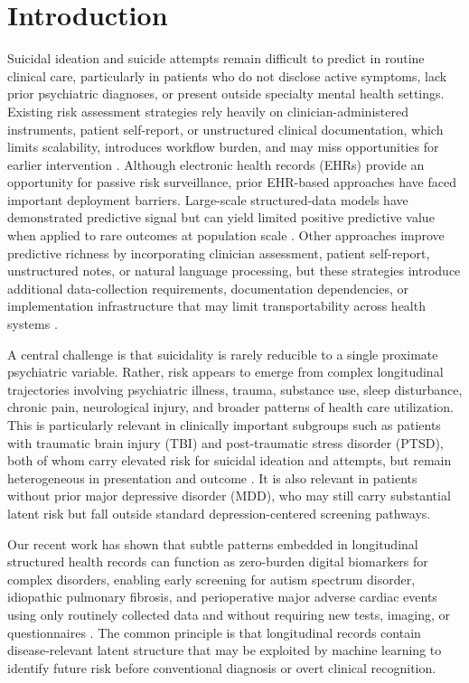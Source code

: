 \documentclass[onecolumn, compsoc,11pt]{IEEEtran}
\begin{document}
\vspace{20pt}
\section*{Introduction}

Suicidal ideation and suicide attempts remain difficult to predict in routine clinical care, particularly in patients who do not disclose active symptoms, lack prior psychiatric diagnoses, or present outside specialty mental health settings. Existing risk assessment strategies rely heavily on clinician-administered instruments, patient self-report, or unstructured clinical documentation, which limits scalability, introduces workflow burden, and may miss opportunities for earlier intervention \cite{nock2017psychological,tang2022people,fowler2022suicide}. Although electronic health records (EHRs) provide an opportunity for passive risk surveillance, prior EHR-based approaches have faced important deployment barriers. Large-scale structured-data models have demonstrated predictive signal but can yield limited positive predictive value when applied to rare outcomes at population scale \cite{simon2018predicting,belsher2019prediction}. Other approaches improve predictive richness by incorporating clinician assessment, patient self-report, unstructured notes, or natural language processing, but these strategies introduce additional data-collection requirements, documentation dependencies, or implementation infrastructure that may limit transportability across health systems \cite{tsui2021natural,walsh2021predicting,barakcorren2020validation}.

A central challenge is that suicidality is rarely reducible to a single proximate psychiatric variable. Rather, risk appears to emerge from complex longitudinal trajectories involving psychiatric illness, trauma, substance use, sleep disturbance, chronic pain, neurological injury, and broader patterns of health care utilization. This is particularly relevant in clinically important subgroups such as patients with traumatic brain injury (TBI) and post-traumatic stress disorder (PTSD), both of whom carry elevated risk for suicidal ideation and attempts, but remain heterogeneous in presentation and outcome \cite{nock2017psychological}. It is also relevant in patients without prior major depressive disorder (MDD), who may still carry substantial latent risk but fall outside standard depression-centered screening pathways.

Our recent work has shown that subtle patterns embedded in longitudinal structured health records can function as zero-burden digital biomarkers for complex disorders, enabling early screening for autism spectrum disorder, idiopathic pulmonary fibrosis, and perioperative major adverse cardiac events using only routinely collected data and without requiring new tests, imaging, or questionnaires \cite{onishchenko2021reduced,onishchenko2022screening,JAHA2022}. The common principle is that longitudinal records contain disease-relevant latent structure that may be exploited by machine learning to identify future risk before conventional diagnosis or overt clinical recognition.
\end{document}
